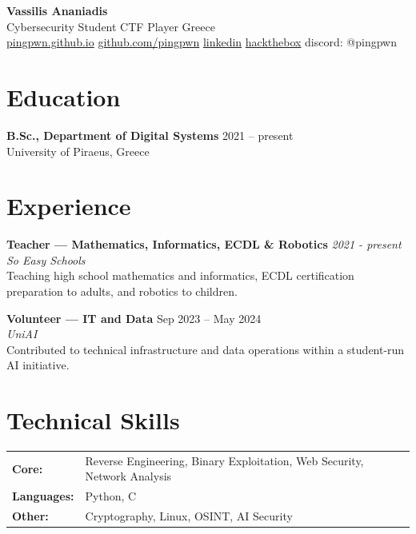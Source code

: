 \documentclass[10pt, a4paper]{article}
\begin{document}
\begin{center}
  {\Large\bfseries Vassilis Ananiadis}\\[5pt]
  {\small Cybersecurity Student \textbar{} CTF Player \textbar{} Greece}\\[4pt]
  {\small
    \href{https://pingpwn.github.io}{pingpwn.github.io}\enspace\textbar\enspace
    \href{https://github.com/pingpwn}{github.com/pingpwn}\enspace\textbar\enspace
    \href{https://www.linkedin.com/in/vassilis-a-039178359/}{linkedin}\enspace\textbar\enspace
    \href{https://app.hackthebox.com/users/771008}{hackthebox}\enspace\textbar\enspace
    discord: @pingpwn
  }
\end{center}

\vspace{4pt}

\section{Education}

\textbf{B.Sc., Department of Digital Systems} \hfill 2021 – present\\
University of Piraeus, Greece

\section{Experience}

\textbf{Teacher — Mathematics, Informatics, ECDL \& Robotics} \hfill \textit{2021 - present}\\
\textit{So Easy Schools}\\[3pt]
Teaching high school mathematics and informatics, ECDL certification preparation to adults, and robotics to children.

\medskip

\textbf{Volunteer — IT and Data} \hfill Sep 2023 – May 2024\\
\textit{UniAI} \hfill \\[3pt]
Contributed to technical infrastructure and data operations within a student-run AI initiative.

\section{Technical Skills}

\begin{tabular}{@{}ll}
  \textbf{Core:}      & Reverse Engineering, Binary Exploitation, Web Security, Network Analysis \\[2pt]
  \textbf{Languages:} & Python, C \\[2pt]
  \textbf{Other:}     & Cryptography, Linux, OSINT, AI Security \\
\end{tabular}
\end{document}
